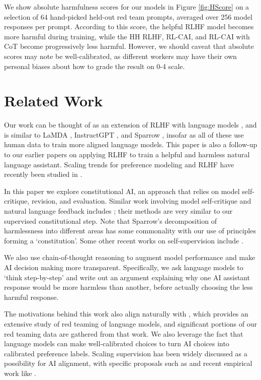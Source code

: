 We show absolute harmfulness scores for our models in Figure \ref{fig:HScore} on a selection of 64 hand-picked held-out red team prompts, averaged over 256 model responses per prompt. According to this score, the helpful RLHF model becomes more harmful during training, while the HH RLHF, RL-CAI, and RL-CAI with CoT become progressively less harmful. However, we should caveat that absolute scores may note be well-calibrated, as different workers may have their own personal biases about how to grade the result on 0-4 scale.

\section{Related Work}

Our work can be thought of as an extension of RLHF \cite{christiano2017deep} with language models \cite{stiennon2020learning}, and is similar to LaMDA \cite{LaMDA}, InstructGPT \cite{InstructGPT}, and Sparrow \cite{SparrowDM}, insofar as all of these use human data to train more aligned language models. This paper is also a follow-up to our earlier papers \cite{askell2021general, bai2022training} on applying RLHF to train a helpful and harmless natural language assistant.  Scaling trends for preference modeling and RLHF have recently been studied in \cite{ScalingLawsPM}.

In this paper  we explore constitutional AI, an approach that relies on model self-critique, revision, and evaluation. Similar work involving model self-critique and natural language feedback includes \cite{EthicalAdviceTaker, PerezLanguageFeedback,  OAISelfCritique}; their methods are very similar to our supervised constitutional step.   Note that Sparrow's \cite{SparrowDM} decomposition of harmlessness into different areas has some commonality with our use of principles forming a `constitution'.  Some other recent works on self-supervision include \cite{LemonsRelabeling, SelfImproveCapabilities}.

We also use chain-of-thought reasoning \cite{ScratchPad, ChainOfThought} to augment model performance and make AI decision making more transparent.  Specifically, we ask language models to `think step-by-step' \cite{StepByStep} and write out an argument explaining why one AI assistant response would be more harmless than another, before actually choosing the less harmful response.

The motivations behind this work also align naturally with \cite{DeepRedTeaming}, which provides an extensive study of red teaming of language models, and significant portions of our red teaming data are gathered from that work. We also leverage the fact that language models can make well-calibrated choices \cite{LMsKnowWhatTheyKnow} to turn AI choices into calibrated preference labels. Scaling supervision has been widely discussed as a possibility for AI alignment, with specific proposals such as \cite{christiano2018supervising,irving2018ai} and recent empirical work like \cite{BowmanSandwiching}.

